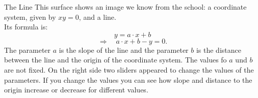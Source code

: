 \begin{surferPage}[Line]{The Line}
This surface shows an image we know from the school: a coordinate system, given by  $xy=0$, and a line. \\Its formula is:
\[y=a\cdot x + b\]
\[ \Rightarrow \quad a\cdot x +b -y=0.\]
The parameter $a$ is the slope of the line and the parameter $b$ is the distance between the line and the origin of the coordinate system.
\newline \newline
The values fo $a$ und $b$ are not fixed. On the right side two sliders appeared to change the values of the parameters. If you change the values you can see how slope and distance to the origin increase or decrease for different values.
\end{surferPage}
